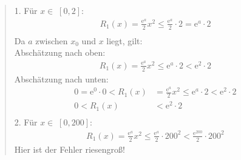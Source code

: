 \begin{quote}
1. Für $ x\in \;[0,2] $:\\
\begin{align*}
R_1(x)=\frac{\mathrm{e}^a}{2}x^2\leq \frac{\mathrm{e}^a}{2}\cdot 2=\mathrm{e}^a\cdot 2\\
\end{align*}
Da $ a $ zwischen $ x_0 $ und $  x $ liegt, gilt:\\
Abschätzung nach oben:\\
\begin{align*}
R_1(x)=\frac{\mathrm{e}^a}{2}x^2\leq \mathrm{e}^a\cdot 2 < \mathrm{e}^2\cdot 2
\end{align*}
Abschätzung nach unten:\\
\begin{align*}
0=\mathrm{e}^0\cdot 0<R_1(x)&=\frac{\mathrm{e}^a}{2}x^2\leq \mathrm{e}^a\cdot 2 < \mathrm{e}^2\cdot 2\\
0<R_1(x)& < \mathrm{e}^2\cdot 2\\
\end{align*}
2. Für $ x\in \;[0,200] $:\\
\begin{align*}
R_1(x)=\frac{\mathrm{e}^a}{2}x^2\leq \frac{\mathrm{e}^a}{2}\cdot 200^2<\frac{\mathrm{e}^{200}}{2}\cdot 200^2
\end{align*}
Hier ist der Fehler riesengroß!\\

\end{quote}

